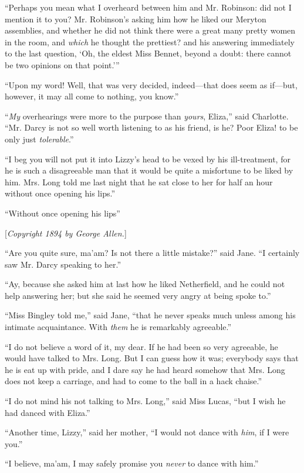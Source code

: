 \documentclass[12pt,openright]{book}
\begin{document}
“Perhaps you mean what I overheard between him and Mr. Robinson: did not I mention it to you? Mr. Robinson’s asking him how he liked our Meryton assemblies, and whether he did not think there were a great many pretty women in the room, and \textit{which} he thought the prettiest? and his answering immediately to the last question, ‘Oh, the eldest Miss Bennet, beyond a doubt: there cannot be two opinions on that point.’”

“Upon my word! Well, that was very decided, indeed—that does seem as if—but, however, it may all come to nothing, you know.”

“\textit{My} overhearings were more to the purpose than \textit{yours}, Eliza,” said Charlotte. “Mr. Darcy is not so well worth listening to as his friend, is he? Poor Eliza! to be only just \textit{tolerable}.”

“I beg you will not put it into Lizzy’s head to be vexed by his ill-treatment, for he is such a disagreeable man that it would be quite a misfortune to be liked by him. Mrs. Long told me last night that he sat close to her for half an hour without once opening his lips.”

“Without once opening his lips”

[\textit{Copyright 1894 by George Allen.}]

“Are you quite sure, ma’am? Is not there a little mistake?” said Jane. “I certainly saw Mr. Darcy speaking to her.”

“Ay, because she asked him at last how he liked Netherfield, and he could not help answering her; but she said he seemed very angry at being spoke to.”

“Miss Bingley told me,” said Jane, “that he never speaks much unless among his intimate acquaintance. With \textit{them} he is remarkably agreeable.”

“I do not believe a word of it, my dear. If he had been so very agreeable, he would have talked to Mrs. Long. But I can guess how it was; everybody says that he is eat up with pride, and I dare say he had heard somehow that Mrs. Long does not keep a carriage, and had to come to the ball in a hack chaise.”

“I do not mind his not talking to Mrs. Long,” said Miss Lucas, “but I wish he had danced with Eliza.”

“Another time, Lizzy,” said her mother, “I would not dance with \textit{him}, if I were you.”

“I believe, ma’am, I may safely promise you \textit{never} to dance with him.”
\end{document}
